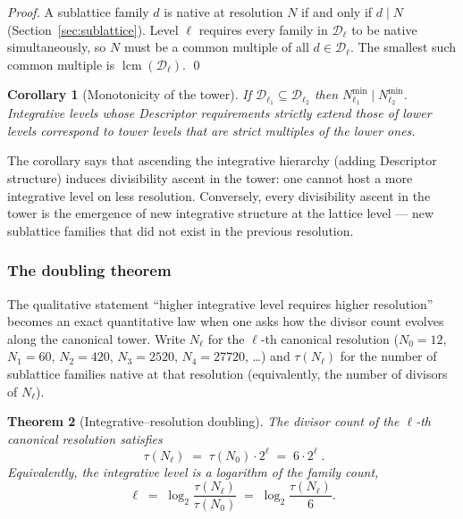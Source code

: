 \documentclass[11pt,a4paper]{article}
\newtheorem{theorem}{Theorem}[section]
\newtheorem{corollary}[theorem]{Corollary}
\theoremstyle{definition}
\theoremstyle{remark}
\DeclareMathOperator{\lcm}{lcm}
\begin{document}
\begin{proof}
A sublattice family $d$ is native at resolution $N$ if and only if $d\mid N$ (Section~\ref{sec:sublattice}). Level $\ell$ requires every family in $\mathcal{D}_{\ell}$ to be native simultaneously, so $N$ must be a common multiple of all $d\in\mathcal{D}_{\ell}$. The smallest such common multiple is $\lcm(\mathcal{D}_{\ell})$. \qed
\end{proof}

\begin{corollary}[Monotonicity of the tower]\label{cor:int-monotone}
If $\mathcal{D}_{\ell_{1}}\subseteq\mathcal{D}_{\ell_{2}}$ then $N_{\ell_{1}}^{\min}\mid N_{\ell_{2}}^{\min}$. Integrative levels whose Descriptor requirements strictly extend those of lower levels correspond to tower levels that are strict multiples of the lower ones.
\end{corollary}

The corollary says that ascending the integrative hierarchy (adding Descriptor structure) induces divisibility ascent in the tower: one cannot host a more integrative level on less resolution. Conversely, every divisibility ascent in the tower is the emergence of new integrative structure at the lattice level --- new sublattice families that did not exist in the previous resolution.

\subsubsection*{The doubling theorem}

The qualitative statement ``higher integrative level requires higher resolution'' becomes an exact quantitative law when one asks how the divisor count evolves along the canonical tower. Write $N_{\ell}$ for the $\ell$-th canonical resolution ($N_{0}=12$, $N_{1}=60$, $N_{2}=420$, $N_{3}=2520$, $N_{4}=27720$, \ldots) and $\tau(N_{\ell})$ for the number of sublattice families native at that resolution (equivalently, the number of divisors of $N_{\ell}$).

\begin{theorem}[Integrative--resolution doubling]\label{thm:doubling}
The divisor count of the $\ell$-th canonical resolution satisfies
\begin{equation}\label{eq:doubling}
\boxed{\;\tau(N_{\ell}) \;=\; \tau(N_{0})\cdot 2^{\ell} \;=\; 6\cdot 2^{\ell}\;.}
\end{equation}
Equivalently, the integrative level is a logarithm of the family count,
\begin{equation}\label{eq:level-log}
\ell \;=\; \log_{2}\!\frac{\tau(N_{\ell})}{\tau(N_{0})} \;=\; \log_{2}\!\frac{\tau(N_{\ell})}{6}.
\end{equation}
\end{theorem}
\end{document}
